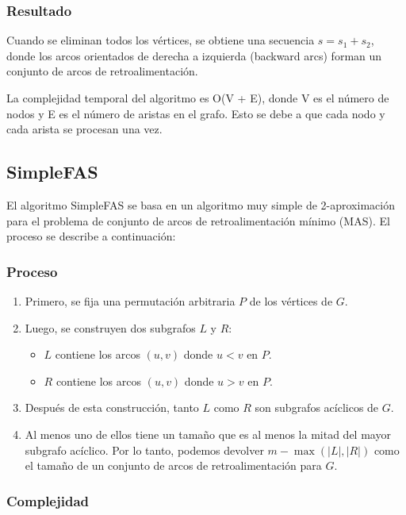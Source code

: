 \documentclass{article}
\begin{document}
\subsubsection{Resultado}

Cuando se eliminan todos los vértices, se obtiene una secuencia $s = s_1 + s_2$, donde los arcos orientados de derecha a izquierda (backward arcs) forman un conjunto de arcos de retroalimentación.


La complejidad temporal del algoritmo es O(V + E), donde V es el número de nodos y E es el número de aristas en el grafo. Esto se debe a que cada nodo y cada arista se procesan una vez.


\subsection{SimpleFAS}

El algoritmo SimpleFAS se basa en un algoritmo muy simple de 2-aproximación para el problema de conjunto de arcos de retroalimentación mínimo (MAS). El proceso se describe a continuación:

\subsubsection{Proceso}

\begin{enumerate}
    \item Primero, se fija una permutación arbitraria $P$ de los vértices de $G$.
    \item Luego, se construyen dos subgrafos $L$ y $R$:
    \begin{itemize}
        \item $L$ contiene los arcos $(u, v)$ donde $u < v$ en $P$.
        \item $R$ contiene los arcos $(u, v)$ donde $u > v$ en $P$.
    \end{itemize}
    \item Después de esta construcción, tanto $L$ como $R$ son subgrafos acíclicos de $G$.
    \item Al menos uno de ellos tiene un tamaño que es al menos la mitad del mayor subgrafo acíclico. Por lo tanto, podemos devolver $m-\max(|L|, |R|)$ como el tamaño de un conjunto de arcos de retroalimentación para $G$.
\end{enumerate}

\subsubsection{Complejidad}
\end{document}
